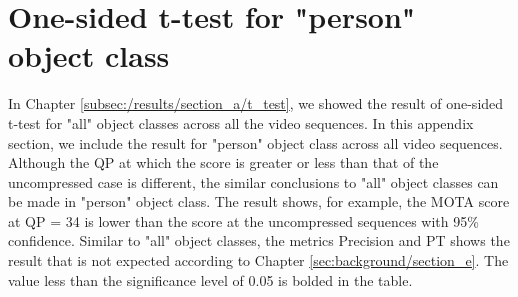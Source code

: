 \section{One-sided t-test for "person" object class}
\label{sec:appendix/section_t_test_0}

In Chapter \ref{subsec:/results/section_a/t_test}, we showed the result of one-sided t-test for "all" object classes across all the video sequences. In this appendix section, we include the result for "person" object class across all video sequences. Although the QP at which the score is greater or less than that of the uncompressed case is different, the similar conclusions to "all" object classes can be made in "person" object class. The result shows, for example, the MOTA score at QP = 34 is lower than the score at the uncompressed sequences with 95\% confidence. Similar to "all" object classes, the metrics Precision and PT shows the result that is not expected according to Chapter \ref{sec:background/section_e}. The value less than the significance level of 0.05 is bolded in the table.
